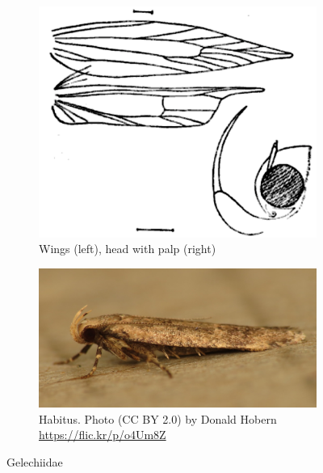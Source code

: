 \documentclass[letterpaper, 11pt]{article}
\begin{document}
\begin{figure}[ht!]
    \centering
    \begin{subfigure}[ht!]{0.4\textwidth}
        \includegraphics[width=\textwidth]{GelechiidWing}
        \caption{Wings (left), head with palp (right) \citep[][Fig. 27]{busck1903revision}}
        \label{fig:gelechiid1}
    \end{subfigure}
    \hfill %
    \begin{subfigure}[ht!]{0.47\textwidth}
        \includegraphics[width=\textwidth]{gelechiid}
        \caption{Habitus. Photo (CC BY 2.0) by Donald Hobern \url{https://flic.kr/p/o4Um8Z}}
        \label{fig:gelechiid2}
    \end{subfigure}
    \caption{Gelechiidae}\label{fig:gelechiids}
\end{figure}
\end{document}
